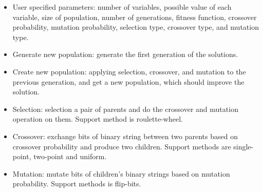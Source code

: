 \documentclass[landscape,a0paper,fontscale=0.275]{baposter} %
\newcommand{\compresslist}{ %
	\setlength{\itemsep}{1pt}
	\setlength{\parskip}{0pt}
	\setlength{\parsep}{0pt}
	}
\begin{document}
\begin{poster}
{\begin{multicols}{2}
{
	}

	\vspace{3em}

	\begin{itemize}\compresslist
	\item User specified parameters: number of variables, possible value of each variable, size of population, number of generations, fitness function, crossover probability, mutation probability, selection type, crossover type, and mutation type.
	\item Generate new population: generate the first generation of the solutions.
	\item Create new population: applying selection, crossover, and mutation to the previous generation, and get a new population, which should improve the solution.
	\item Selection: selection a pair of parents and do the crossover and mutation operation on them. Support method is roulette-wheel.
	\item Crossover: exchange bits of binary string between two parents based on crossover probability and produce two children. Support methods are single-point, two-point and uniform.
	\item Mutation: mutate bits of children's binary strings based on mutation probability. Support methods is flip-bits.
	\end{itemize}

	\end{multicols}
	}


\end{poster}
\end{document}
